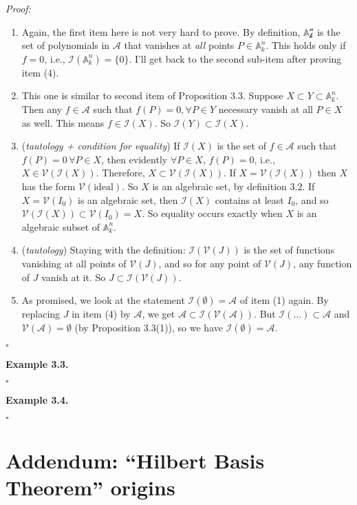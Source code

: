 \documentclass[12pt]{article}
\begin{document}
\noindent \textit{Proof:} 
\begin{enumerate}
	\item Again, the first item here is not very hard to prove. By definition, $\mathcal{\mathbb{A}^n_k}$ is the set of polynomials in $\mathcal{A}$ that vanishes at \textit{all} points $P \in \mathbb{A}^n_k$. This holds only if $f = 0$, i.e., $\mathcal{I}(\mathbb{A}^n_k) = \{0\}$. I'll get back to the second sub-item after proving item (4). 
	\item This one is similar to second item of Proposition 3.3. Suppose $X \subset Y \subset \mathbb{A}^n_k$. Then any $f\in \mathcal{A}$ such that $f(P) = 0, \forall P \in Y$ necessary vanish at all $P \in X$ as well. This means $f \in \mathcal{I}(X)$. So $\mathcal{I}(Y) \subset \mathcal{I}(X)$.
	\item (\textit{tautology + condition for equality}) If $\mathcal{I}(X)$ is the set of $f \in \mathcal{A}$ such that $f(P) = 0\, \forall P \in X$, then evidently $\forall P \in X$, $f(P) = 0$, i.e., $X \in \mathcal{V}(\mathcal{I}(X))$. Therefore, $X \subset \mathcal{V}(\mathcal{I}(X))$. If $X = \mathcal{V}(\mathcal{I}(X))$ then $X$ has the form $\mathcal{V}(\text{ideal})$. So $X$ is an algebraic set, by definition 3.2. If $X = \mathcal{V}(I_0)$ is an algebraic set, then $\mathcal{I}(X)$ contains at least $I_0$, and so $\mathcal{V}(\mathcal{I}(X)) \subset \mathcal{V}(I_0) = X$. So equality occurs exactly when $X$ is an algebraic subset of $\mathbb{A}^n_k$. 
	\item (\textit{tautology}) Staying with the definition: $\mathcal{I}(\mathcal{V}(J))$ is the set of functions vanishing at all points of $\mathcal{V}(J)$, and so for any point of $\mathcal{V}(J)$, any function of $J$ vanish at it. So $J \subset \mathcal{I}(\mathcal{V}(J))$. 
	\item As promised, we look at the statement $\mathcal{I}(\emptyset) = \mathcal{A}$ of item (1) again. By replacing $J$ in item (4) by $\mathcal{A}$, we get $\mathcal{A} \subset \mathcal{I}(\mathcal{V}(\mathcal{A}))$. But $\mathcal{I}(\dots) \subset \mathcal{A}$ and $\mathcal{V}(\mathcal{A}) = \emptyset$ (by Proposition 3.3(1)), so we have $\mathcal{I}(\emptyset) = \mathcal{A}$.   
\end{enumerate}



\hfill $\square$





\noindent \textbf{Example 3.3.}


\hfill $\square$



\noindent \textbf{Example 3.4.}


\hfill $\square$







\newpage


\section{Addendum: ``Hilbert Basis Theorem'' origins}



















	
\end{document}
